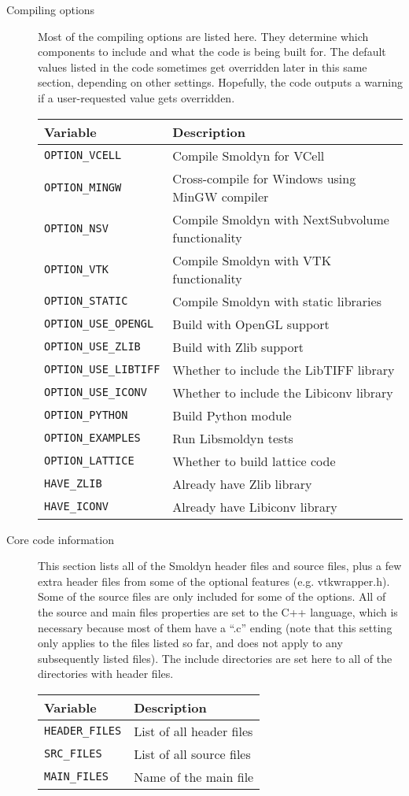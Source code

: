 \documentclass {scrbook}
\newcommand {\ttt} {\texttt}
\begin{document}
\begin{description}
\item[Compiling options]
Most of the compiling options are listed here. They determine which components to include and what the code is being built for. The default values listed in the code sometimes get overridden later in this same section, depending on other settings. Hopefully, the code outputs a warning if a user-requested value gets overridden.
\begin{longtable}[c]{ll}
Variable & Description\\
\hline
\ttt{OPTION\_VCELL} & Compile Smoldyn for VCell\\
\ttt{OPTION\_MINGW} & Cross-compile for Windows using MinGW compiler\\
\ttt{OPTION\_NSV} & Compile Smoldyn with NextSubvolume functionality\\
\ttt{OPTION\_VTK} & Compile Smoldyn with VTK functionality\\
\ttt{OPTION\_STATIC} & Compile Smoldyn with static libraries\\
\ttt{OPTION\_USE\_OPENGL} & Build with OpenGL support\\
\ttt{OPTION\_USE\_ZLIB} & Build with Zlib support\\
\ttt{OPTION\_USE\_LIBTIFF} & Whether to include the LibTIFF library\\
\ttt{OPTION\_USE\_ICONV} & Whether to include the Libiconv library\\
\ttt{OPTION\_PYTHON}  & Build Python module\\
\ttt{OPTION\_EXAMPLES} & Run Libsmoldyn tests\\
\ttt{OPTION\_LATTICE} & Whether to build lattice code\\
\ttt{HAVE\_ZLIB} & Already have Zlib library\\
\ttt{HAVE\_ICONV} & Already have Libiconv library\\
\end{longtable}

\item[Core code information]
This section lists all of the Smoldyn header files and source files, plus a few extra header files from some of the optional features (e.g. vtkwrapper.h). Some of the source files are only included for some of the options. All of the source and main files properties are set to the C++ language, which is necessary because most of them have a ``.c'' ending (note that this setting only applies to the files listed so far, and does not apply to any subsequently listed files). The include directories are set here to all of the directories with header files.
\begin{longtable}[c]{ll}
Variable & Description\\
\hline
\ttt{HEADER\_FILES} & List of all header files\\
\ttt{SRC\_FILES} & List of all source files\\
\ttt{MAIN\_FILES} & Name of the main file\\
\end{longtable}


\end{description}
\end{document}
